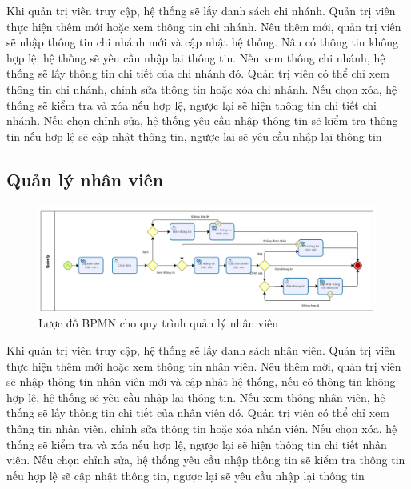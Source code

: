 Khi quản trị viên truy cập, hệ thống sẽ lấy danh sách chi nhánh. Quản trị viên thực hiện thêm mới hoặc xem thông tin chi nhánh. Nêu thêm mới, quản trị viên sẽ nhập thông tin chi nhánh mới và cập nhật hệ thống. Nâu có thông tin không hợp lệ, hệ thống sẽ yêu cầu nhập lại thông tin. Nếu xem thông chi nhánh, hệ thống sẽ lấy thông tin chi tiết của chi nhánh đó. Quản trị viên có thể chỉ xem thông tin chi nhánh, chỉnh sửa thông tin hoặc xóa chi nhánh. Nếu chọn xóa, hệ thống sẽ kiểm tra và xóa nếu hợp lệ, ngược lại sẽ hiện thông tin chi tiết chi nhánh. Nếu chọn chỉnh sửa, hệ thống yêu cầu nhập thông tin sẽ kiểm tra thông tin nếu hợp lệ sẽ cập nhật thông tin, ngược lại sẽ yêu cầu nhập lại thông tin


\subsection{Quản lý nhân viên}
\begin{figure}[!htp]
	\centering
	\includegraphics[width=16cm]{img/BPMN/Hien/Employee_Management.png}
	\newline
	\caption{Lược đồ BPMN cho quy trình quản lý nhân viên}
\end{figure}

Khi quản trị viên truy cập, hệ thống sẽ lấy danh sách nhân viên. Quản trị viên thực hiện thêm mới hoặc xem thông tin nhân viên. Nêu thêm mới, quản trị viên sẽ nhập thông tin nhân viên mới và cập nhật hệ thống, nếu có thông tin không hợp lệ, hệ thống sẽ yêu cầu nhập lại thông tin. Nếu xem thông nhân viên, hệ thống sẽ lấy thông tin chi tiết của nhân viên đó. Quản trị viên có thể chỉ xem thông tin nhân viên, chỉnh sửa thông tin hoặc xóa nhân viên. Nếu chọn xóa, hệ thống sẽ kiểm tra và xóa nếu hợp lệ, ngược lại sẽ hiện thông tin chi tiết nhân viên. Nếu chọn chỉnh sửa, hệ thống yêu cầu nhập thông tin sẽ kiểm tra thông tin nếu hợp lệ sẽ cập nhật thông tin, ngược lại sẽ yêu cầu nhập lại thông tin

\newpage

